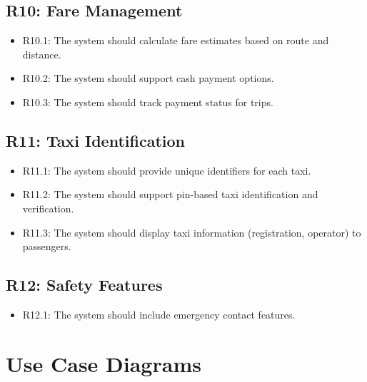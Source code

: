\documentclass[a4paper,12pt]{article}
\begin{document}
\subsection*{R10: Fare Management}
\begin{itemize}
    \item R10.1: The system should calculate fare estimates based on route and distance.
    \item R10.2: The system should support cash payment options.
    \item R10.3: The system should track payment status for trips.
\end{itemize}

\subsection*{R11: Taxi Identification}
\begin{itemize}
    \item R11.1: The system should provide unique identifiers for each taxi.
    \item R11.2: The system should support  pin-based taxi identification and verification.
    \item R11.3: The system should display taxi information (registration, operator) to passengers.
\end{itemize}

\subsection*{R12: Safety Features}
\begin{itemize}
    \item R12.1: The system should include emergency contact features.
\end{itemize}

\section{Use Case Diagrams}
\end{document}
